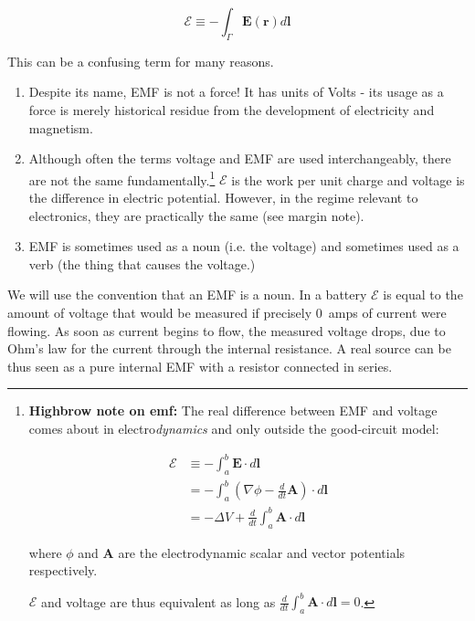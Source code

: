 \documentclass{tufte-book}
\begin{document}
\begin{equation}\label{eq:def_emf}
\mathcal{E} \equiv -\int_\Gamma\textbf{E}(\textbf{r})d\textbf{l}
\end{equation}

This can be a confusing term for many reasons.
\begin{enumerate}
\item Despite its name, EMF is not a force! It has units of Volts - its usage as a force is merely historical residue from the development of electricity and magnetism. 
\item Although often the terms voltage and EMF are used interchangeably, there are not the same fundamentally.\footnote{\textbf{Highbrow note on emf:} The real difference between EMF and voltage comes about in electro\textit{dynamics} and only outside the good-circuit model:

\begin{align*}
\mathcal{E} &\equiv -\int_a^b\mathbf{E}\cdot d\mathbf{l} \\ &= -\int_a^b\left(\nabla\phi - \frac{d}{dt}\mathbf{A}\right)\cdot d\mathbf{l} \\
&= -\Delta V + \frac{d}{dt}\int_a^b\mathbf{A}\cdot d\mathbf{l} 
\end{align*}

\noindent where $\phi$ and $\mathbf{A}$ are the electrodynamic scalar and vector potentials respectively. 


\noindent $\mathcal{E}$ and voltage are thus equivalent as long as $\frac{d}{dt}\int_a^b\mathbf{A}\cdot d\mathbf{l}  = 0$.} $\mathcal{E}$ is the work per unit charge and voltage is the difference in electric potential. However, in the regime relevant to electronics, they are practically the same (see margin note).
\item EMF is sometimes used as a noun (i.e. the voltage) and sometimes used as a verb (the thing that causes the voltage.)
\end{enumerate}

We will use the convention that an EMF is a noun. In a battery $\mathcal{E}$ is equal to the amount of voltage that would be measured if precisely 0~amps of current were flowing. As soon as current begins to flow, the measured voltage drops, due to Ohm's law for the current through the internal resistance. A real source can be thus seen as a pure internal EMF with a resistor connected in series.
\end{document}
